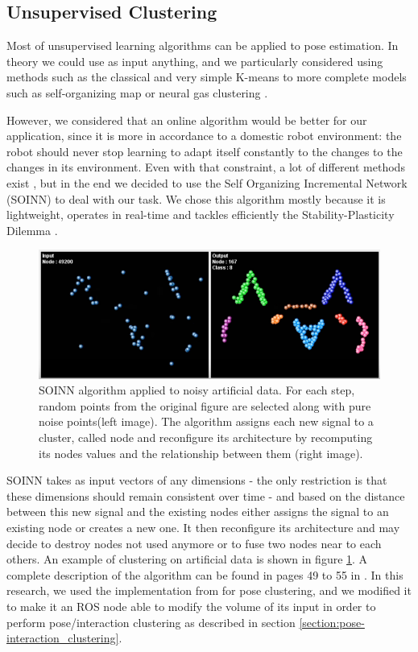 \subsection{Unsupervised Clustering}
\label{section:SOINN}
Most of unsupervised learning algorithms can be applied to pose estimation. In theory we could use as input anything, and we particularly considered using methods such as the classical and very simple K-means \cite{k_means} to more complete models such as self-organizing map \cite{self_organizing_map} or neural gas clustering \cite{neural_gas}.

However, we considered that an online algorithm would be better for our application, since it is more in accordance to a domestic robot environment: the robot should never stop learning to adapt itself constantly to the changes to the changes in its environment. Even with that constraint, a lot of different methods exist \cite{online_clustering_algo}, but in the end we decided to use the Self Organizing Incremental Network (SOINN) \cite{SOINN} to deal with our task. We chose this algorithm mostly because it is lightweight, operates in real-time and tackles efficiently the Stability-Plasticity Dilemma \cite{stability-plasticity_dilemma}. 

\begin{figure}[h]
    \centering
    \includegraphics[width=150mm, keepaspectratio]{images/SOINN_cat.png}
    \caption{SOINN algorithm applied to noisy artificial data. For each step, random points from the original figure are selected along with pure noise points(left image). The algorithm assigns each new signal to a cluster, called node and reconfigure its architecture by recomputing its nodes values and the relationship between them (right image).}
    \label{fig:SOINN_cat}
\end{figure}

SOINN takes as input vectors of any dimensions - the only restriction is that these dimensions should remain consistent over time - and based on the distance between this new signal and the existing nodes either assigns the signal to an existing node or creates a new one. It then reconfigure its architecture and may decide to destroy nodes not used anymore or to fuse two nodes near to each others.
An example of clustering on artificial data is shown in figure \ref{fig:SOINN_cat}. A complete description of the algorithm can be found in pages 49 to 55 in \cite{SOINN}. In this research, we used the implementation from \cite{soinn_implementation} for pose clustering, and we modified it to make it an ROS node able to modify the volume of its input in order to perform pose/interaction clustering as described in section \ref{section:pose-interaction_clustering}.

